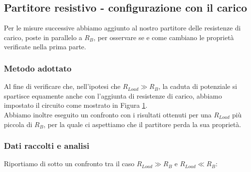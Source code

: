 \documentclass[a4paper]{article}
\theoremstyle{definition}
\begin{document}
\subsection{Partitore resistivo - configurazione con il carico}
Per le misure successive abbiamo aggiunto al nostro partitore delle resistenze di carico, poste in parallelo a \(R_{B}\), per osservare se e come cambiano le proprietà verificate nella prima parte.\\

\subsubsection*{Metodo adottato}
Al fine di verificare che, nell'ipotesi che \(R_{Load} \gg R_{B}\), la caduta di potenziale si spartisce equamente anche con l'aggiunta di resistenze di carico, abbiamo impostato il circuito come mostrato in Figura \ref{fig:partitore2}.\\
Abbiamo inoltre eseguito un confronto con i risultati ottenuti per una \(R_{Load}\) più piccola di \(R_{B}\), per la quale ci aspettiamo che il partitore perda la sua proprietà.

\pagebreak

\begin{figure}[!ht]

    \caption{}
  \label{fig:partitore2}
\end{figure}

\subsubsection*{Dati raccolti e analisi}
Riportiamo di sotto un confronto tra il caso \(R_{Load} \gg R_{B}\) e \(R_{Load} \ll R_{B}\):\\
\end{document}
